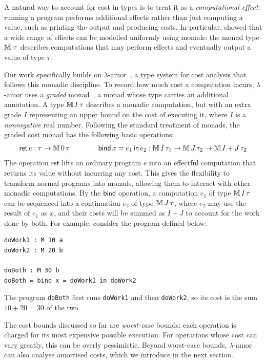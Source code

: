 A natural way to account for cost in types is to treat it as a
\emph{computational effect}: running a program performs additional effects rather than just computing a value, 
such as printing the output and producing costs. In particular, \citet{moggi91} showed that a wide
range of effects can be modelled uniformly using monads: the monad
type $\mathbb{M}\,{}\, \tau$ describes computations that may perform effects and eventually
output a value of type $\tau$.

Our work specifically builds on
$\lambda$-amor~\citep{rajaniUnifyingTypetheoryHigherorder2021a}, a type
system for cost analysis that follows this monadic discipline. To record how
much cost a computation incurs, $\lambda$-amor uses a \emph{graded}
monad~\citep{katsumata14}, a monad whose type carries an additional
annotation. A type $\mathbb{M}\,{I}\, \tau$ describes a monadic computation, but with an extra grade $I$ representing an upper bound on the cost of executing it, where $I$ is a \emph{nonnegative} real number. 
Following the standard treatment of monads, the graded cost monad has the following basic operations:
\[
  \mathsf{ret}\, e : \tau \to \mathbb{M}\,{0}\, \tau
  \qquad\qquad
  \mathsf{bind}\, x= e_1 \, \mathsf{in}\, e_2 : \mathbb{M}\,{I}\, \tau_1 \to \mathbb{M}\,{J}\, \tau_2 \to \mathbb{M}\,{I + J}\, \tau_2
\]
The operation $\mathsf{ret}$ lifts an ordinary program $e$ into an effectful computation that returns
its value without incurring any cost. This gives the flexibility to transform normal programs into monads, allowing them to interact with other monadic computations.
By the $\mathsf{bind}$ operation, a computation $e_1$ of type $\mathbb{M}\,{I}\, \tau$ can be sequenced into a continuation $e_2$ of type $\mathbb{M}\,{J}\, \tau$, where $e_2$ may use the result of $e_1$ as $x$, and their 
costs will be summed as $I+J$ to account for the work done by both.
For example, consider the program defined below:
\begin{lstlisting}[style=hs]
doWork1 : M 10 a
doWork2 : M 20 b

doBoth : M 30 b 
doBoth = bind x = doWork1 in doWork2
\end{lstlisting}
The program \texttt{doBoth} first runs \texttt{doWork1} and then \texttt{doWork2}, so its cost is the sum $10 + 20 = 30$ of the two.

The cost bounds discussed so far are \emph{worst-case} bounds: each operation is
charged for its most expensive possible execution. For operations whose cost can
vary greatly, this can be overly pessimistic. Beyond
worst-case bounds, $\lambda$-amor can also analyse amortised costs, 
which we introduce in the next section.

